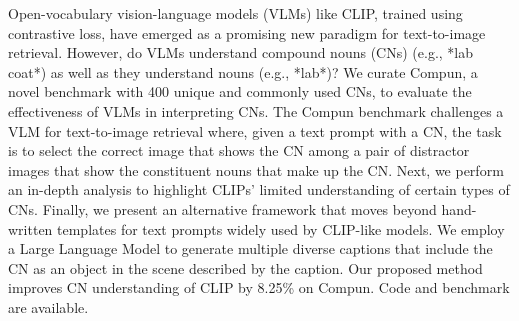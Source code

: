 Open-vocabulary vision-language models (VLMs) like CLIP, trained using contrastive loss, have emerged as a promising new paradigm for text-to-image retrieval. However, do VLMs understand compound nouns (CNs) (e.g., *lab coat*) as well as they understand nouns (e.g., *lab*)? We curate Compun, a novel benchmark with 400 unique and commonly used CNs, to evaluate the effectiveness of VLMs in interpreting CNs. The Compun benchmark challenges a VLM for text-to-image retrieval where, given a text prompt with a CN, the task is to select the correct image that shows the CN among a pair of distractor images that show the constituent nouns that make up the CN. Next, we perform an in-depth analysis to highlight CLIPs' limited understanding of certain types of CNs. Finally, we present an alternative framework that moves beyond hand-written templates for text prompts widely used by CLIP-like models. We employ a Large Language Model to generate multiple diverse captions that include the CN as an object in the scene described by the caption. Our proposed method improves CN understanding of CLIP by 8.25\% on Compun. Code and benchmark are available.